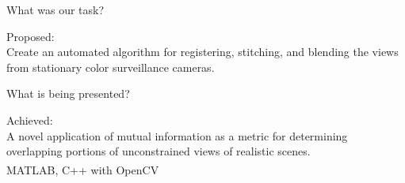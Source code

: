 \documentclass{beamer}
\begin{document}
\begin{frame}[c]{\sc What was our task?}

\begin{center}
{\sc Proposed}:
\\
Create an automated algorithm for registering, stitching, and blending the views from stationary color surveillance cameras.
\end{center}

\end{frame}


\begin{frame}[t]{\sc What is being presented?}

\begin{center}
{\sc Achieved}:
\\
A novel application of mutual information as a metric for determining overlapping portions of unconstrained views of realistic scenes.
\\
\vskip 1in
MATLAB\textsuperscript{\textregistered}, C++ with OpenCV
\end{center}

\end{frame}



\end{document}
